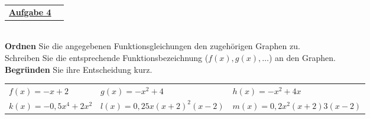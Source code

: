 \documentclass[oneside,openany,headings=optiontotoc,11pt,numbers=noenddot]{scrreprt}
\begin{document}
	\begin{tabularx}{\textwidth}{Xl}\underline{\textbf{Aufgabe 4}}&\end{tabularx}\\
	\textbf{Ordnen} Sie die angegebenen Funktionsgleichungen den zugehörigen Graphen zu.\\
	Schreiben Sie die entsprechende Funktionsbezeichnung (\(f(x), g(x), \ldots\)) an den Graphen.\\
	\textbf{Begründen} Sie ihre Entscheidung kurz.\\
	\par\noindent
	\renewcommand{\arraystretch}{1.3}
	\begin{tabularx}{\textwidth}{XXX}
		\(f(x) = -x + 2\) & \(g(x) = -x^2 + 4\) & \(h(x) = -x^2 + 4x\)\\
		\(k(x) = -0,5x^4 + 2x^2\) & \(l(x) = 0,25x(x+2)^2(x-2)\) & \(m(x) = 0,2x^2(x+2)3(x-2)\)
	\end{tabularx}\\
	\par\noindent
\end{document}

